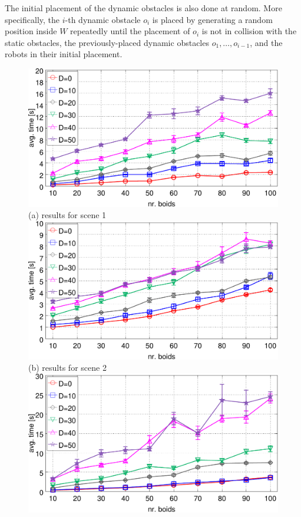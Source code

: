 \documentclass[letterpaper, 10pt, conference]{ieeeconf}
\begin{document}
The initial placement of the dynamic obstacles is also done at
random. More specifically, the $i$-th dynamic obstacle $o_i$ is placed
by generating a random position inside $W$ repeatedly until the
placement of $o_i$ is not in collision with the static obstacles, the
previously-placed dynamic obstacles $o_1, \ldots, o_{i-1}$, and the
robots in their initial placement.



\begin{figure}
\centering
\includegraphics[width=\columnwidth]{usef/figResDynamicA}\\
(a) results for scene 1 \\
\includegraphics[width=\columnwidth]{usef/figResDynamicB}\\
(b) results for scene 2\\
\includegraphics[width=\columnwidth]{usef/figResDynamicC}\\

\end{figure}
\end{document}
